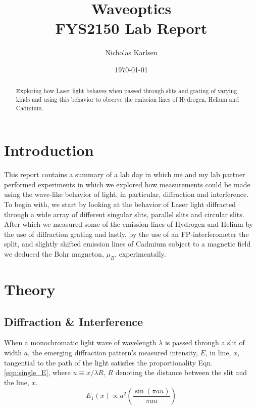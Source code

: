 \documentclass[11pt,a4paper]{article}
\begin{document}
\title{Waveoptics\\
\normalsize{FYS2150 Lab Report}}

\author{Nicholas Karlsen}

\date{\today}%

\maketitle

\begin{abstract}
  Exploring how Laser light behaves when passed through slits and grating of varying kinds and using this behavior to observe the emission lines of Hydrogen, Helium and Cadmium.
\end{abstract}


\section{\label{sect:intro}Introduction}
  This report contains a summary of a lab day in which me and my lab partner performed experiments in which we explored how measurements could be made using the wave-like behavior of light, in particular, diffraction and interference.
  To begin with, we start by looking at the behavior of Laser light diffracted through a wide array of different singular slits, parallel slits and circular slits. After which we measured some of the emission lines of Hydrogen and Helium by the use of diffraction grating and lastly, by the use of an FP-interferometer the split, and slightly shifted emission lines of Cadmium subject to a magnetic field we deduced the Bohr magneton, $\mu_B$, experimentally.

\section{\label{sect:theory}Theory}
  \subsection{Diffraction \& Interference}
    When a monochromatic light wave of wavelength $\lambda$ is passed through a slit of width $a$, the emerging diffraction pattern's measured intensity, $E$, in line, $x$, tangential to the path of the light satisfies the proportionality Eqn. \ref{eqn:single_E}, where $u \equiv x / \lambda R$, $R$ denoting the distance between the slit and the line, $x$.
    \begin{equation}
      E_1(x) \propto a^2 \left( \frac{\sin(\pi a u)}{\pi a u} \right)
      \label{eqn:single_E}
    \end{equation}
\end{document}
